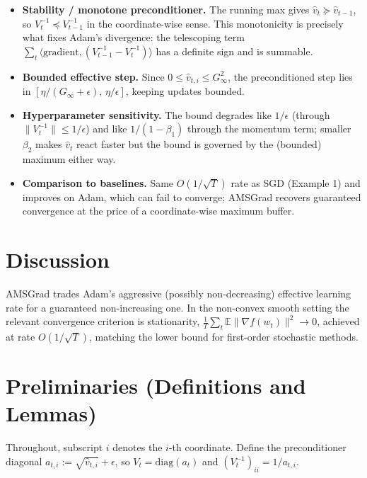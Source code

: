 \documentclass[11pt]{article}
\begin{document}
\begin{itemize}
\item \textbf{Stability / monotone preconditioner.} The running max gives
$\hat v_t \succeq \hat v_{t-1}$, so $V_t^{-1}\preceq V_{t-1}^{-1}$ in the
coordinate-wise sense. This monotonicity is precisely what fixes Adam's
divergence: the telescoping term $\sum_t \langle \text{gradient},
(V_{t-1}^{-1}-V_t^{-1})\rangle$ has a definite sign and is summable.
\item \textbf{Bounded effective step.} Since $0\le \hat v_{t,i}\le G_\infty^2$,
the preconditioned step lies in $[\eta/(G_\infty+\epsilon),\,\eta/\epsilon]$,
keeping updates bounded.
\item \textbf{Hyperparameter sensitivity.} The bound degrades like $1/\epsilon$
(through $\|V_t^{-1}\|\le 1/\epsilon$) and like $1/(1-\beta_1)$ through the
momentum term; smaller $\beta_2$ makes $\hat v_t$ react faster but the bound is
governed by the (bounded) maximum either way.
\item \textbf{Comparison to baselines.} Same $O(1/\sqrt T)$ rate as SGD
(Example 1) and improves on Adam, which can fail to converge; AMSGrad recovers
guaranteed convergence at the price of a coordinate-wise maximum buffer.
\end{itemize}

\section*{Discussion}

AMSGrad trades Adam's aggressive (possibly non-decreasing) effective learning
rate for a guaranteed non-increasing one. In the non-convex smooth setting the
relevant convergence criterion is stationarity,
$\frac1T\sum_t \mathbb{E}\|\nabla f(w_t)\|^2 \to 0$, achieved at rate
$O(1/\sqrt T)$, matching the lower bound for first-order stochastic methods.

\section*{Preliminaries (Definitions and Lemmas)}

Throughout, subscript $i$ denotes the $i$-th coordinate. Define the
preconditioner diagonal $a_{t,i} := \sqrt{\hat v_{t,i}}+\epsilon$, so
$V_t = \mathrm{diag}(a_t)$ and $(V_t^{-1})_{ii} = 1/a_{t,i}$.
\end{document}
